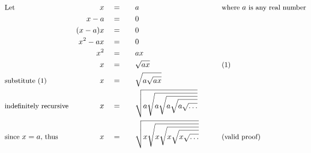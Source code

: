 \begin{alignat*}{7}
&\small\text{Let}\normalsize&x\quad&=\quad&&a\qquad&&\small\text{where }a\text{ is any real number}\normalsize\\
&\,&x-a\quad&=&&0\\
&\,&(x-a)x\quad&=&&0\\
&\,&x^2-ax\quad&=&&0\\
&\,&x^2\quad&=&&ax\\
&\,&x\quad&=&&\sqrt{ax}&&\small\text{(1)}\\
&\small\text{substitute (1)}\normalsize&x\quad&=&&\sqrt{a\sqrt{ax}}\\
&\small\text{indefinitely recursive}\normalsize&x\quad&=&&\sqrt{a\sqrt{a\sqrt{a\sqrt{a\sqrt{\ldots}}}}}\\
&\small\text{since }x=a\text{, thus}\normalsize&x\quad&=&&\sqrt{x\sqrt{x\sqrt{x\sqrt{x\sqrt{\ldots}}}}}\qquad&&\small\text{(valid proof)}
\end{alignat*}
